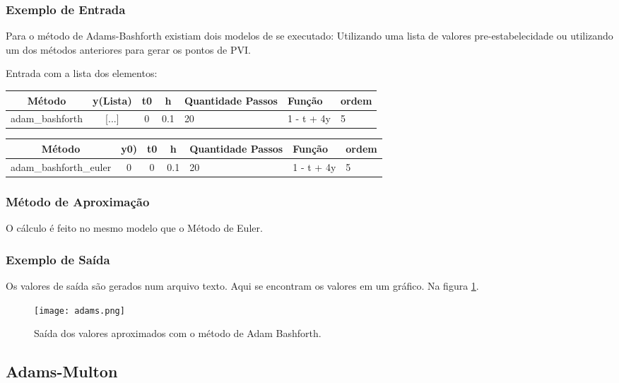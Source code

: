 \documentclass[a4paper]{article}
\begin{document}
\subsubsection{Exemplo de Entrada}
Para o método de Adams-Bashforth existiam dois modelos de se executado: Utilizando uma lista de valores pre-estabelecidade ou utilizando um dos métodos anteriores para gerar os pontos de PVI. \par
Entrada com a lista dos elementos:
\begin{table}[H]
\centering
\begin{tabular}{|c|c|c|c|l|l|l|}
\hline
Método & y(Lista) & t0 & h   & Quantidade Passos & Função & ordem\\ \hline
adam\_bashforth  & [...]  & 0  & 0.1 & 20                &  1 - t + 4y & 5     \\ \hline
\end{tabular}
\end{table}

\begin{table}[H]
\centering
\begin{tabular}{|c|c|c|c|l|l|l|}
\hline
Método & y0) & t0 & h   & Quantidade Passos & Função & ordem\\ \hline
adam\_bashforth\_euler  & 0  & 0  & 0.1 & 20                &  1 - t + 4y & 5     \\ \hline
\end{tabular}
\end{table}


\subsubsection{Método de Aproximação}
O cálculo é feito no mesmo modelo que o Método de Euler.
\subsubsection{Exemplo de Saída}
Os valores de saída são gerados num arquivo texto. Aqui se encontram os valores em um gráfico. Na figura \ref{fig:adam_bashforth}.
\begin{figure}[H]
\centering
\texttt{[image: adams.png]}
\caption{\label{fig:adam_bashforth}Saída dos valores aproximados com o método de Adam Bashforth.}
\end{figure}






\subsection{Adams-Multon}
\end{document}
